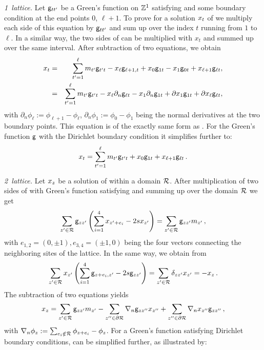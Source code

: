 \documentclass[12pt]{iopart}
\begin{document}
\noindent\emph{1\dmn\ lattice.}
Let $\mathsf{g}_{tt'}$ be a Green's function on $\mathbb{Z}^1$  satisfying
 and some boundary condition at the end points $0$,
$\ell+1$.   To prove  for a solution $x_{t}$ of
  we  multiply  each  side of  this equation by
$\mathsf{g}_{tt'}$  and sum up over the index $t$ running  from $1$ to $\ell$.
In a similar way, the two sides of      can be
multiplied with  $x_t$ and summed up over the same interval. After
subtraction of two equations, we obtain
\begin{eqnarray*}
 x_{t}&=&\sum_{t'=1}^{\ell}{m_{t'}}\mathsf{g}_{t't} -x_{\ell} \mathsf{g}_{\ell+1,t}+x_0 \mathsf{g}_{1t} -x_1 \mathsf{g}_{0t}+x_{\ell+1} \mathsf{g}_{\ell t}, \\
 &=&\sum_{t'=1}^{\ell}{m_{t'}}\mathsf{g}_{t't} - x_{\ell} \partial_n \mathsf{g}_{\ell t}-x_1 \partial_n \mathsf{g}_{1t}   +\partial x_1 \mathsf{g}_{1t} +\partial x_{\ell} \mathsf{g}_{\ell t},
\end{eqnarray*}
with $\partial_n \phi_{\ell} := \phi_{\ell+1}-\phi_{\ell} $,
$\partial_n \phi_{1} := \phi_{0}-\phi_{1} $
being the normal derivatives  at the two boundary points. This equation is
of the exactly same form as .  For the Green's function
$\mathsf{g}$ with the Dirichlet boundary condition it  simplifies further  to:
\begin{equation}
 x_{t}=\sum_{t'=1}^{\ell}{m_{t'}}\mathsf{g}_{t't}
          +x_0 \mathsf{g}_{1t}
          +x_{\ell+1} \mathsf{g}_{\ell t}
\,.
\label{GreensTheor1DLattice}
\end{equation}

\noindent\emph{2\dmn\ lattice.}
Let $x_{z}$ be a solution of   within   a
domain  $\mathcal{R}$.  After multiplication of two sides of
 with  Green's function  satisfying 
and summing up over the domain $\mathcal{R}$  we get
\[
\sum_{z' \in\mathcal{R}}\mathsf{g}_{zz'}\left(\sum_{i=1}^4 x_{z'+e_i}-2sx_{z'}\right)
  =\sum_{z' \in\mathcal{R}}\mathsf{g}_{zz'}{m_{z'}}
  \,,
\]
with $e_{1,2}=(0,\pm 1), e_{3,4}=(\pm 1,0)$  being the four vectors connecting the neighboring sites
of the lattice. In the same way, we obtain from 
\[
\sum_{z' \in\mathcal{R}}x_{z'}\left(\sum_{i=1}^4 \mathsf{g}_{z+e_i,z'}-2s\mathsf{g}_{zz'}\right)
=\sum_{z' \in\mathcal{R}}\delta_{zz'}x_{z'}
=-x_{z}
\,.
\]
The subtraction of two equations yields
\begin{equation}
 x_z = \sum_{z' \in\mathcal{R}} \mathsf{g}_{zz'}{m_{z'}}
 -  \sum_{z'' \in\partial \mathcal{R}}\nabla_n \mathsf{g}_{zz''}x_{z''}
  + \sum_{z'' \in\partial \mathcal{R}} \nabla_n x_{z''} \mathsf{g}_{zz''}
\,,
\label{GreensTheor2DLattice}
\end{equation}
with  $\nabla_n \phi_z:= \sum_{e_i\notin \mathcal{R}}\phi_{z+e_i} -\phi_{z}$.
For a  Green's function  satisfying Dirichlet  boundary conditions,
  can be simplified  further, as illustrated by:
\end{document}
